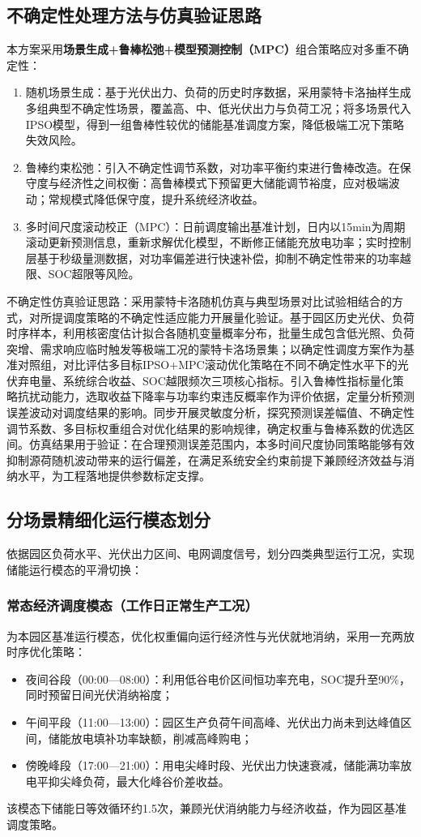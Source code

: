 \documentclass[12pt,a4paper]{article}
\begin{document}
\subsection{不确定性处理方法与仿真验证思路}
本方案采用\textbf{场景生成+鲁棒松弛+模型预测控制（MPC）}组合策略应对多重不确定性：
\begin{enumerate}
    \item 随机场景生成：基于光伏出力、负荷的历史时序数据，采用蒙特卡洛抽样生成多组典型不确定性场景，覆盖高、中、低光伏出力与负荷工况；将多场景代入IPSO模型，得到一组鲁棒性较优的储能基准调度方案，降低极端工况下策略失效风险。
    \item 鲁棒约束松弛：引入不确定性调节系数，对功率平衡约束进行鲁棒改造。在保守度与经济性之间权衡：高鲁棒模式下预留更大储能调节裕度，应对极端波动；常规模式降低保守度，提升系统经济收益。
    \item 多时间尺度滚动校正（MPC）：日前调度输出基准计划，日内以15min为周期滚动更新预测信息，重新求解优化模型，不断修正储能充放电功率；实时控制层基于秒级量测数据，对功率偏差进行快速补偿，抑制不确定性带来的功率越限、SOC超限等风险。
\end{enumerate}

不确定性仿真验证思路：采用蒙特卡洛随机仿真与典型场景对比试验相结合的方式，对所提调度策略的不确定性适应能力开展量化验证。基于园区历史光伏、负荷时序样本，利用核密度估计拟合各随机变量概率分布，批量生成包含低光照、负荷突增、需求响应临时触发等极端工况的蒙特卡洛场景集；以确定性调度方案作为基准对照组，对比评估多目标IPSO+MPC滚动优化策略在不同不确定性水平下的光伏弃电量、系统综合收益、SOC越限频次三项核心指标。引入鲁棒性指标量化策略抗扰动能力，选取收益下降率与功率约束违反概率作为评价依据，定量分析预测误差波动对调度结果的影响。同步开展灵敏度分析，探究预测误差幅值、不确定性调节系数、多目标权重组合对优化结果的影响规律，确定权重与鲁棒系数的优选区间。仿真结果用于验证：在合理预测误差范围内，本多时间尺度协同策略能够有效抑制源荷随机波动带来的运行偏差，在满足系统安全约束前提下兼顾经济效益与消纳水平，为工程落地提供参数标定支撑。

\subsection{分场景精细化运行模态划分}
依据园区负荷水平、光伏出力区间、电网调度信号，划分四类典型运行工况，实现储能运行模态的平滑切换：

\subsubsection{常态经济调度模态（工作日正常生产工况）}
为本园区基准运行模态，优化权重偏向运行经济性与光伏就地消纳，采用一充两放时序优化策略：
\begin{itemize}
    \item 夜间谷段（00:00—08:00）：利用低谷电价区间恒功率充电，SOC提升至90\%，同时预留日间光伏消纳裕度；
    \item 午间平段（11:00—13:00）：园区生产负荷午间高峰、光伏出力尚未到达峰值区间，储能放电填补功率缺额，削减高峰购电；
    \item 傍晚峰段（17:00—21:00）：用电尖峰时段、光伏出力快速衰减，储能满功率放电平抑尖峰负荷，最大化峰谷价差收益。
\end{itemize}
该模态下储能日等效循环约1.5次，兼顾光伏消纳能力与经济收益，作为园区基准调度策略。
\end{document}
